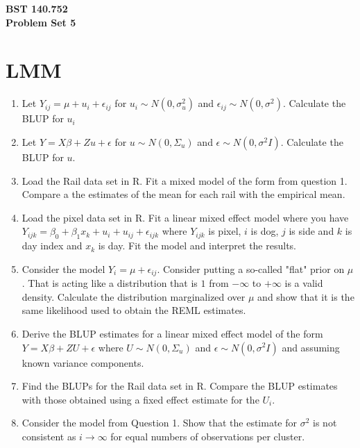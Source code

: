 \documentclass[12pt]{article}
\begin{document}
\noindent
{\bf BST 140.752 \\ Problem Set 5} \\

\section{LMM}
\begin{enumerate}
\item Let $Y_{ij} = \mu + u_i + \epsilon_{ij}$ for $u_i \sim N(0,\sigma^2_u)$ and $\epsilon_{ij} \sim N(0, \sigma^2)$. Calculate the BLUP 
for $u_i$
\item Let $Y = X \beta + Z u + \epsilon$ for $u \sim N(0,\Sigma_u)$ and $\epsilon \sim N(0, \sigma^2 I)$. Calculate the BLUP for $u$. 
\item Load the Rail data set in R. Fit a mixed model of the form from question 1. Compare a the estimates of the mean for each rail with the empirical mean.	
\item Load the pixel data set in R. Fit a linear mixed effect model where you have $Y_{ijk} = \beta_0 + \beta_1 x_{k} + u_{i} + u_{ij} + \epsilon_{ijk}$
where $Y_{ijk}$ is pixel, $i$ is dog, $j$ is side and $k$ is day index and $x_k$ is day. Fit the model and interpret the results.
\item Consider the model $Y_{i} = \mu + \epsilon_{ij}$. Consider putting a so-called "flat" prior on $\mu$. That is acting like a distribution
that is $1$ from $-\infty$ to $+\infty$ is a valid density. Calculate the distribution marginalized over $\mu$ and show that it is the same likelihood
used to obtain the REML estimates.
\item Derive the BLUP estimates for a linear mixed effect model of the 
form $Y = X\beta + Z U + \epsilon$ where $U \sim N(0, \Sigma_u)$
and $\epsilon \sim N(0, \sigma^2 I)$ and 
assuming known variance components. 
\item Find the BLUPs for the Rail data set in R. Compare the BLUP estimates
with those obtained using a fixed effect estimate for the $U_i$.
\item Consider the model from Question 1. Show that the estimate for 
$\sigma^2$ is not consistent as $i \rightarrow \infty$ for equal
numbers of observations per cluster. 
\end{enumerate}
\end{document}

